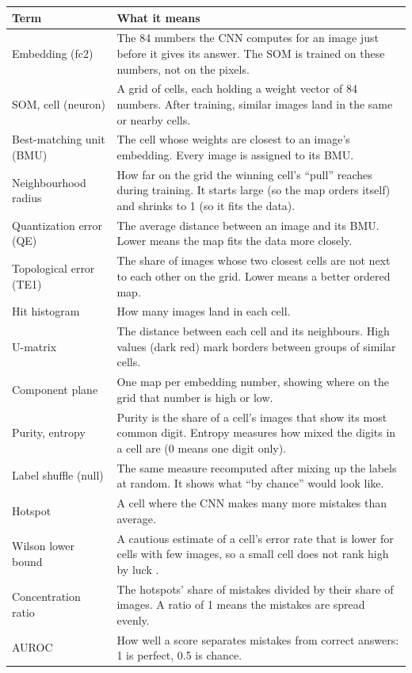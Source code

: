 \documentclass[11pt]{article}
\begin{document}
{\small
\renewcommand{\arraystretch}{1.12}
\begin{tabularx}{\textwidth}{|>{\raggedright\arraybackslash}p{}|X|}
\hline
\textbf{Term} & \textbf{What it means} \\ \hline
Embedding (fc2) & The 84 numbers the CNN computes for an image just before it gives its answer. The SOM is trained on these numbers, not on the pixels. \\ \hline
SOM, cell (neuron) & A grid of cells, each holding a weight vector of 84 numbers. After training, similar images land in the same or nearby cells. \\ \hline
Best-matching unit (BMU) & The cell whose weights are closest to an image's embedding. Every image is assigned to its BMU. \\ \hline
Neighbourhood radius & How far on the grid the winning cell's ``pull'' reaches during training. It starts large (so the map orders itself) and shrinks to 1 (so it fits the data). \\ \hline
Quantization error (QE) & The average distance between an image and its BMU. Lower means the map fits the data more closely. \\ \hline
Topological error (TE1) & The share of images whose two closest cells are not next to each other on the grid. Lower means a better ordered map. \\ \hline
Hit histogram & How many images land in each cell. \\ \hline
U-matrix & The distance between each cell and its neighbours. High values (dark red) mark borders between groups of similar cells. \\ \hline
Component plane & One map per embedding number, showing where on the grid that number is high or low. \\ \hline
Purity, entropy & Purity is the share of a cell's images that show its most common digit. Entropy measures how mixed the digits in a cell are (0 means one digit only). \\ \hline
Label shuffle (null) & The same measure recomputed after mixing up the labels at random. It shows what ``by chance'' would look like. \\ \hline
Hotspot & A cell where the CNN makes many more mistakes than average. \\ \hline
Wilson lower bound & A cautious estimate of a cell's error rate that is lower for cells with few images, so a small cell does not rank high by luck \cite{wilson1927probable}. \\ \hline
Concentration ratio & The hotspots' share of mistakes divided by their share of images. A ratio of 1 means the mistakes are spread evenly. \\ \hline
AUROC & How well a score separates mistakes from correct answers: 1 is perfect, 0.5 is chance. \\ \hline
\end{tabularx}}
\end{document}
